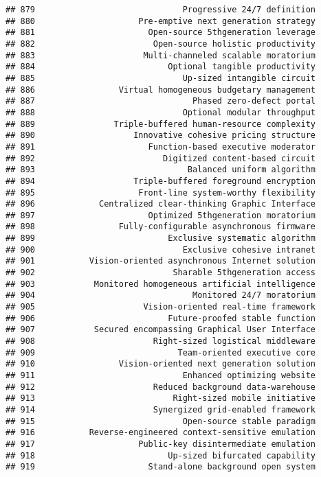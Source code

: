 \documentclass[
]{article}
\begin{document}
\begin{verbatim}
## 879                              Progressive 24/7 definition
## 880                     Pre-emptive next generation strategy
## 881                       Open-source 5thgeneration leverage
## 882                        Open-source holistic productivity
## 883                      Multi-channeled scalable moratorium
## 884                           Optional tangible productivity
## 885                              Up-sized intangible circuit
## 886                 Virtual homogeneous budgetary management
## 887                                Phased zero-defect portal
## 888                              Optional modular throughput
## 889                Triple-buffered human-resource complexity
## 890                    Innovative cohesive pricing structure
## 891                       Function-based executive moderator
## 892                          Digitized content-based circuit
## 893                               Balanced uniform algorithm
## 894                    Triple-buffered foreground encryption
## 895                     Front-line system-worthy flexibility
## 896             Centralized clear-thinking Graphic Interface
## 897                       Optimized 5thgeneration moratorium
## 898                 Fully-configurable asynchronous firmware
## 899                           Exclusive systematic algorithm
## 900                              Exclusive cohesive intranet
## 901           Vision-oriented asynchronous Internet solution
## 902                            Sharable 5thgeneration access
## 903            Monitored homogeneous artificial intelligence
## 904                                Monitored 24/7 moratorium
## 905                      Vision-oriented real-time framework
## 906                           Future-proofed stable function
## 907            Secured encompassing Graphical User Interface
## 908                        Right-sized logistical middleware
## 909                             Team-oriented executive core
## 910                 Vision-oriented next generation solution
## 911                              Enhanced optimizing website
## 912                        Reduced background data-warehouse
## 913                            Right-sized mobile initiative
## 914                        Synergized grid-enabled framework
## 915                              Open-source stable paradigm
## 916           Reverse-engineered context-sensitive emulation
## 917                     Public-key disintermediate emulation
## 918                           Up-sized bifurcated capability
## 919                       Stand-alone background open system

\end{verbatim}
\end{document}
